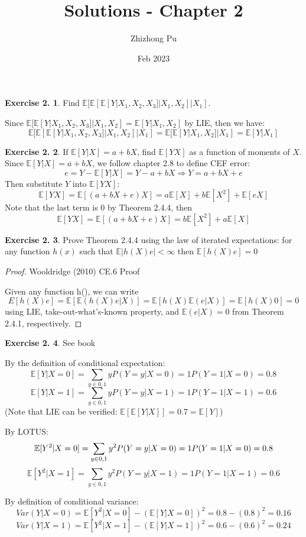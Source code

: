 \documentclass[12pt,letterpaper,reqno]{amsart}
\newcommand{\E}{\mathbb E}
\theoremstyle{plain}
\theoremstyle{definition}
\theoremstyle{definition}
\newtheorem{Exercise}{Exercise 2.}
\numberwithin{equation}{section}
\begin{document}
\author{Zhizhong Pu}
\title{Solutions - Chapter 2}
\date{Feb 2023}
\maketitle

\thispagestyle{empty}

\begin{Exercise} Find $\E[\E[\E[Y|X_1,X_2,X_3]|X_1,X_2]|X_1]$.

    Since $\E[\E[Y|X_1,X_2,X_3]|X_1,X_2]=\E[Y|X_1,X_2]$ by LIE, then we have:
    \[
    \E[\E[\E[Y|X_1,X_2,X_3]|X_1,X_2]|X_1] = \E[\E[Y|X_1,X_2]|X_1] = \E[Y|X_1]
    \]
    
\end{Exercise}

\begin{Exercise} If $\E[Y|X]=a+bX$, find $\E[YX]$ as a function of moments of $X$.
    Since $\E[Y|X]=a+bX$, we follow chapter 2.8 to define CEF error:
    \[
    e=Y-\E[Y|X]=Y-a+bX\Rightarrow Y=a+bX+e
    \]
    Then substitute $Y$ into $\E[YX]$:
    \[
    \E[YX]=\E[(a+bX+e)X]=a\E[X]+b\E[X^2]+\E[eX]
    \]
    Note that the last term is $0$ by Theorem 2.4.4, then
    \[
     \E[YX]=\E[(a+bX+e)X]=b\E[X^2]+a\E[X]
    \]

\end{Exercise}

\begin{Exercise}
Prove Theorem 2.4.4 using the law of iterated expectations: for any function $h(x)$ such that $\E|h(X)e|<\infty$ then $\E[h(X)e]=0$
    \begin{proof} Wooldridge (2010) CE.6 Proof

    Given any function h(), we can write
    \[
    E[h(X)e]=\E[\E(h(X)e|X)]=\E[h(X)\E(e|X)]=\E[h(X)0]=0
    \]
    using LIE, take-out-what's-known property, and $\E(e|X)=0$ from Theorem 2.4.1, respectively.
    \end{proof}
\end{Exercise}

\begin{Exercise} See book

By the definition of conditional expectation:
\[
    \E[Y|X=0]=\sum_{y\in{0,1}}yP(Y=y|X=0)=1P(Y=1|X=0)=0.8 
\]
\[
    \E[Y|X=1]=\sum_{y\in{0,1}}yP(Y=y|X=1)=1P(Y=1|X=1)=0.6
\]
(Note that LIE can be verified: $\E[\E[Y|X]]=0.7=\E[Y]$)

By LOTUS:
\[
    \E[Y^2|X=0]=\sum_{y\in{0,1}}y^2P(Y=y|X=0)=1P(Y=1|X=0)=0.8 \\
\]
\[
    \E[Y^2|X=1]=\sum_{y\in{0,1}}y^2P(Y=y|X=1)=1P(Y=1|X=1)=0.6
\]

By definition of conditional variance:
\[
    Var(Y|X=0)=\E[Y^2|X=0]-(\E[Y|X=0])^2=0.8-(0.8)^2=0.16
\]
\[
    Var(Y|X=1)=\E[Y^2|X=1]-(\E[Y|X=1])^2=0.6-(0.6)^2=0.24
\]

\end{Exercise}
\end{document}
